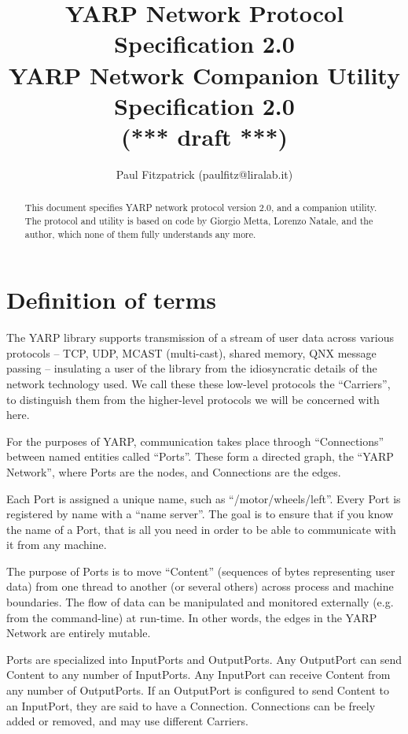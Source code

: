 \documentclass[a4]{article}
\title{
YARP Network Protocol Specification 2.0 \\
YARP Network Companion Utility Specification 2.0 \\
(*** draft ***)
}
\author{Paul Fitzpatrick (paulfitz@liralab.it)}
\begin{document}
\maketitle


\begin{abstract}

\noindent
This document specifies YARP network protocol version 2.0,
and a companion utility.  The
protocol and utility is based on code by Giorgio
Metta, Lorenzo Natale, and the author, which none of them fully
understands any more.

\end{abstract}



\tableofcontents


\section{Definition of terms}

The YARP library supports transmission of a stream of
user data across
various protocols -- TCP, UDP, MCAST (multi-cast), shared memory, QNX
message passing -- insulating a user of the library from the
idiosyncratic details of the network technology used.  We call these
these low-level protocols the ``Carriers'', to distinguish them from
the higher-level protocols we will be concerned with here.

For the purposes of YARP, communication takes place throogh
``Connections'' between named entities called ``Ports''.
These form a directed graph, the ``YARP Network'', where Ports are the nodes,
and Connections are the edges.

Each Port is assigned a unique name, such as ``/motor/wheels/left''.  
Every Port is registered by name with
a ``name server''.  The goal is to ensure that if you know the name
of a Port, that is all you need in order to be able to 
communicate with it from any machine.

The purpose of Ports is to move ``Content'' (sequences of bytes representing 
user data) from
one thread to another (or several others) across process and machine
boundaries.  The flow of data can be manipulated and monitored
externally (e.g. from the command-line) at run-time.  In other words,
the edges in the YARP Network are entirely mutable.

Ports are specialized into InputPorts and OutputPorts.
Any OutputPort can send Content to any number of InputPorts.  Any
InputPort can receive Content from any number of OutputPorts.  If an
OutputPort is configured to send Content to an InputPort, they are
said to have a Connection.  Connections can be freely added or 
removed, and may use different Carriers.
\end{document}

